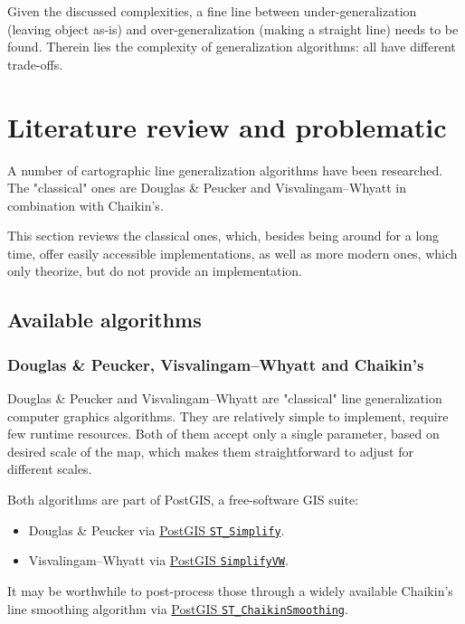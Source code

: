 \documentclass[a4paper]{article}
\newcommand{\DP}{Douglas \& Peucker}
\newcommand{\VW}{Visvalingam--Whyatt}
\begin{document}
Given the discussed complexities, a fine line between under-generalization
(leaving object as-is) and over-generalization (making a straight line) needs
to be found. Therein lies the complexity of generalization algorithms: all have
different trade-offs.

\section{Literature review and problematic}
\label{sec:literature-review}

A number of cartographic line generalization algorithms have been researched.
The "classical" ones are {\DP}\cite{douglas1973algorithms} and
{\VW}\cite{visvalingam1993line} in combination with
Chaikin's\cite{chaikin1974algorithm}.

This section reviews the classical ones, which, besides being around for a long
time, offer easily accessible implementations, as well as more modern ones,
which only theorize, but do not provide an implementation.

\subsection{Available algorithms}

\subsubsection{{\DP}, {\VW} and Chaikin's}

{\DP}\cite{douglas1973algorithms} and {\VW}\cite{visvalingam1993line} are
"classical" line generalization computer graphics algorithms. They are
relatively simple to implement, require few runtime resources. Both of them
accept only a single parameter, based on desired scale of the map, which makes
them straightforward to adjust for different scales.

Both algorithms are part of PostGIS, a free-software GIS suite:
\begin{itemize}
    \item {\DP} via
        \href{https://postgis.net/docs/ST_Simplify.html}{PostGIS \texttt{ST\_Simplify}}.

    \item {\VW} via
        \href{https://postgis.net/docs/ST_SimplifyVW.html}{PostGIS \texttt{SimplifyVW}}.
\end{itemize}

It may be worthwhile to post-process those through a widely available Chaikin's
line smoothing algorithm\cite{chaikin1974algorithm} via
\href{https://postgis.net/docs/ST_ChaikinSmoothing.html}{PostGIS
\texttt{ST\_ChaikinSmoothing}}.
\end{document}
